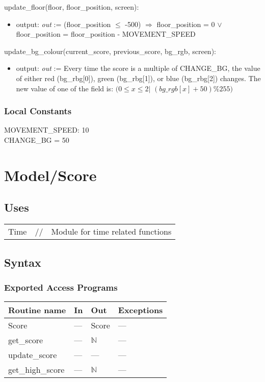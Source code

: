 \documentclass[12pt]{article}
\begin{document}
update\_floor(floor, floor\_position, screen):
\begin{itemize}
    \item output: \textit{out} := (floor\_position $\leq$ -500) $\Rightarrow$ floor\_position = 0 $\lor$ floor\_position = floor\_position - MOVEMENT\_SPEED
\end{itemize}
\noindent update\_bg\_colour(current\_score, previous\_score, bg\_rgb, screen):
\begin{itemize}
    \item output: \textit{out} := Every time the score is a multiple of CHANGE\_BG, the value of either red (bg\_rbg[0]), green (bg\_rbg[1]), or blue (bg\_rbg[2]) changes. The new value of one of the field is: $(0 \leq x \leq 2 |$ $(bg\_rgb[x]+50)\%255)$
\end{itemize}
\subsubsection* {Local Constants}
MOVEMENT\_SPEED: 10 \\
CHANGE\_BG = 50
\newpage
\section*{Model/Score}

\subsection* {Uses}

\begin{tabular}{lll}
    Time & // & Module for time related functions\\
\end{tabular}

\subsection* {Syntax}

\subsubsection* {Exported Access Programs}

\begin{tabular}{| l | l | l | l |}
\hline
\textbf{Routine name} & \textbf{In} & \textbf{Out} & \textbf{Exceptions}\\
\hline
    Score &--- & Score& ---\\
\hline 
    get\_score & --- & $\mathbb{N}$ & --- \\
\hline
    update\_score & --- & --- & ---\\
\hline
    get\_high\_score & --- & $\mathbb{N}$ & --- \\
\hline
\end{tabular}
\end{document}
